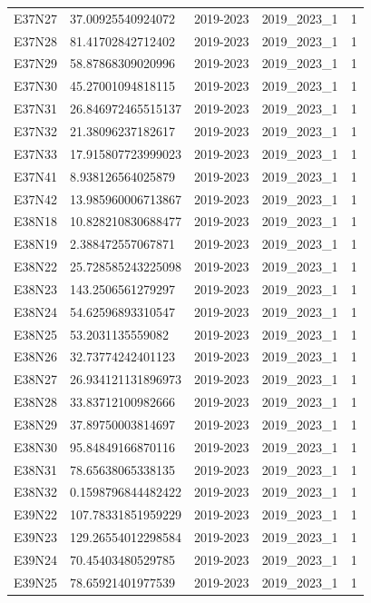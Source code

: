 \begin{landscape}
\begin{longtable}{lllll}
E37N27 & 37.00925540924072 & 2019-2023 & 2019\_2023\_1 & 1 \\
E37N28 & 81.41702842712402 & 2019-2023 & 2019\_2023\_1 & 1 \\
E37N29 & 58.87868309020996 & 2019-2023 & 2019\_2023\_1 & 1 \\
E37N30 & 45.27001094818115 & 2019-2023 & 2019\_2023\_1 & 1 \\
E37N31 & 26.846972465515137 & 2019-2023 & 2019\_2023\_1 & 1 \\
E37N32 & 21.38096237182617 & 2019-2023 & 2019\_2023\_1 & 1 \\
E37N33 & 17.915807723999023 & 2019-2023 & 2019\_2023\_1 & 1 \\
E37N41 & 8.938126564025879 & 2019-2023 & 2019\_2023\_1 & 1 \\
E37N42 & 13.985960006713867 & 2019-2023 & 2019\_2023\_1 & 1 \\
E38N18 & 10.828210830688477 & 2019-2023 & 2019\_2023\_1 & 1 \\
E38N19 & 2.388472557067871 & 2019-2023 & 2019\_2023\_1 & 1 \\
E38N22 & 25.728585243225098 & 2019-2023 & 2019\_2023\_1 & 1 \\
E38N23 & 143.2506561279297 & 2019-2023 & 2019\_2023\_1 & 1 \\
E38N24 & 54.62596893310547 & 2019-2023 & 2019\_2023\_1 & 1 \\
E38N25 & 53.2031135559082 & 2019-2023 & 2019\_2023\_1 & 1 \\
E38N26 & 32.73774242401123 & 2019-2023 & 2019\_2023\_1 & 1 \\
E38N27 & 26.934121131896973 & 2019-2023 & 2019\_2023\_1 & 1 \\
E38N28 & 33.83712100982666 & 2019-2023 & 2019\_2023\_1 & 1 \\
E38N29 & 37.89750003814697 & 2019-2023 & 2019\_2023\_1 & 1 \\
E38N30 & 95.84849166870116 & 2019-2023 & 2019\_2023\_1 & 1 \\
E38N31 & 78.65638065338135 & 2019-2023 & 2019\_2023\_1 & 1 \\
E38N32 & 0.1598796844482422 & 2019-2023 & 2019\_2023\_1 & 1 \\
E39N22 & 107.78331851959229 & 2019-2023 & 2019\_2023\_1 & 1 \\
E39N23 & 129.26554012298584 & 2019-2023 & 2019\_2023\_1 & 1 \\
E39N24 & 70.45403480529785 & 2019-2023 & 2019\_2023\_1 & 1 \\
E39N25 & 78.65921401977539 & 2019-2023 & 2019\_2023\_1 & 1 \\

\end{longtable}
\end{landscape}
